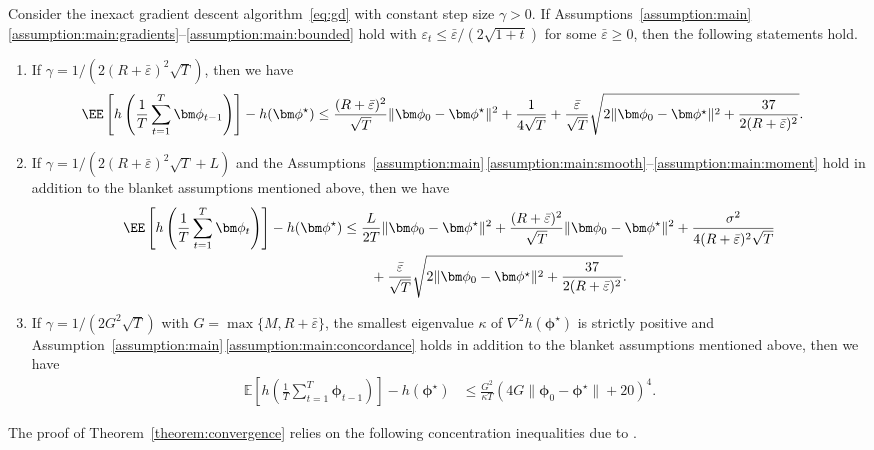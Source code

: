 \documentclass[11pt, a4paper, oneside, reqno]{article}
\begin{document}
	\begin{theorem}	\label{theorem:convergence}
		Consider the inexact gradient descent algorithm~\eqref{eq:gd} with constant step size $\gamma > 0$. If Assumptions~\ref{assumption:main}\,\ref{assumption:main:gradients}--\ref{assumption:main:bounded} hold with $\varepsilon_t \leq {\bar \varepsilon}/{(2\sqrt{1+t})}$ for some $\bar \varepsilon \geq 0$, then the following statements hold.
		\begin{enumerate} [label=(\roman*)]
			\item \label{theorem:convergence:Lipschitz} 
			If $\gamma = 1 / (2 (R + \bar \varepsilon)^2 \sqrt{T})$, then we have
			\begin{align*}
			\EE \left[ h \left(\frac{1}{T} \sum_{t=1}^{T} \bm \phi_{t-1} \right) \right] - h(\bm \phi^\star)
			&\leq \frac{(R + \bar \varepsilon)^2}{\sqrt{T}} \| \bm \phi_0 - \bm \phi^\star \|^2 + \frac{1}{4\sqrt{T}} + \frac{\bar \varepsilon}{\sqrt{T}} \sqrt{2 \| \bm \phi_0 - \bm \phi^\star \|^2 + \frac{37}{2(R + \bar \varepsilon)^2}} .
			\end{align*}
			\item \label{theorem:convergence:smooth} 
			If $\gamma = 1 / (2 (R + \bar \varepsilon)^2 \sqrt{T} + L)$ and the Assumptions~\ref{assumption:main}\,\ref{assumption:main:smooth}--\ref{assumption:main:moment} hold in addition to the blanket assumptions mentioned above, then we have
			\begin{align*}
			\EE \left[ h \left(\frac{1}{T} \sum_{t=1}^{T} \bm \phi_{t} \right) \right] - h(\bm \phi^\star)
			&\leq \frac{L}{2T}\| \bm \phi_0 - \bm \phi^\star \|^2 + 
			\frac{(R + \bar \varepsilon)^2}{\sqrt{T}} \| \bm \phi_0 - \bm \phi^\star \|^2 + \frac{\sigma^2}{4 (R+\bar \varepsilon)^2\sqrt{T}} \\
			&\qquad+ \frac{\bar \varepsilon}{\sqrt{T}} \sqrt{2 \| \bm \phi_0 - \bm \phi^\star \|^2 + \frac{37}{2(R + \bar \varepsilon)^2}}.
			\end{align*}
			\item \label{theorem:convergence:concordance} 
			If $\gamma = 1 / (2 G^2 \sqrt{T})$ with $G = \max \{M, R + \bar \varepsilon \}$, the smallest eigenvalue $\kappa$ of $\nabla^2 h(\bm \phi^\star)$ is strictly positive and Assumption~\ref{assumption:main}\,\ref{assumption:main:concordance} holds in addition to the blanket assumptions mentioned above, then we have
			\begin{align*}
			\mathbb E \left[ h\left(\frac{1}{T} \sum_{t=1}^{T} \bm \phi_{t-1}\right) \right] - h(\bm \phi^\star)
			&\leq \frac{G^2}{\kappa T} \left( 4 G \| \bm \phi_0 - \bm \phi^\star \| + 20 \right)^4.
			\end{align*}
		\end{enumerate}
	\end{theorem}
	The proof of Theorem~\ref{theorem:convergence} relies on the following concentration inequalities due to \citet{bach2013adaptivity}.
	
\end{document}
